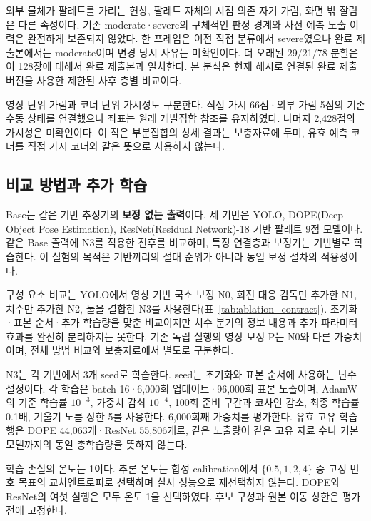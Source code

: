 외부 물체가 팔레트를 가리는 현상, 팔레트 자체의 시점 의존 자기 가림, 화면 밖 잘림은 다른 속성이다. 기존 moderate·severe의 구체적인 판정 경계와 사전 예측 노출 이력은 완전하게 보존되지 않았다. 한 프레임은 이전 직접 분류에서 severe였으나 완료 제출본에서는 moderate이며 변경 당시 사유는 미확인이다. 더 오래된 29/21/78 분할은 이 128장에 대해서 완료 제출본과 일치한다. 본 분석은 현재 해시로 연결된 완료 제출 버전을 사용한 제한된 사후 층별 비교이다.

영상 단위 가림과 코너 단위 가시성도 구분한다. 직접 가시 66점·외부 가림 5점의 기존 수동 상태를 연결했으나 좌표는 원래 개발집합 참조를 유지하였다. 나머지 2,428점의 가시성은 미확인이다. 이 작은 부분집합의 상세 결과는 보충자료에 두며, 유효 예측 코너를 직접 가시 코너와 같은 뜻으로 사용하지 않는다.


\subsection{비교 방법과 추가 학습}
Base는 같은 기반 추정기의 \textbf{보정 없는 출력}이다. 세 기반은 YOLO, DOPE(Deep Object Pose Estimation)\cite{dope2018}, ResNet(Residual Network)-18 기반 팔레트 9점 모델\cite{simple2018}이다. 같은 Base 출력에 N3를 적용한 전후를 비교하며, 특징 연결층과 보정기는 기반별로 학습한다. 이 실험의 목적은 기반끼리의 절대 순위가 아니라 동일 보정 절차의 적용성이다.

구성 요소 비교는 YOLO에서 영상 기반 국소 보정 N0, 회전 대응 감독만 추가한 N1, 치수만 추가한 N2, 둘을 결합한 N3를 사용한다(표~\ref{tab:ablation_contract}). 초기화·표본 순서·추가 학습량을 맞춘 비교이지만 치수 분기의 정보 내용과 추가 파라미터 효과를 완전히 분리하지는 못한다. 기존 독립 실행의 영상 보정 P는 N0와 다른 가중치이며, 전체 방법 비교와 보충자료에서 별도로 구분한다.


N3는 각 기반에서 3개 seed로 학습한다. seed는 초기화와 표본 순서에 사용하는 난수 설정이다. 각 학습은 batch 16·6,000회 업데이트·96,000회 표본 노출이며, AdamW의 기준 학습률 $10^{-3}$, 가중치 감쇠 $10^{-4}$, 100회 준비 구간과 코사인 감소, 최종 학습률 0.1배, 기울기 노름 상한 5를 사용한다. 6,000회째 가중치를 평가한다. 유효 고유 학습 행은 DOPE 44,063개·ResNet 55,806개로, 같은 노출량이 같은 고유 자료 수나 기본 모델까지의 동일 총학습량을 뜻하지 않는다.

학습 손실의 온도는 1이다. 추론 온도는 합성 calibration에서 $\{0.5,1,2,4\}$ 중 고정 번호 목표의 교차엔트로피로 선택하며 실사 성능으로 재선택하지 않는다. DOPE와 ResNet의 여섯 실행은 모두 온도 1을 선택하였다. 후보 구성과 원본 이동 상한은 평가 전에 고정한다.

